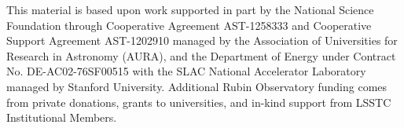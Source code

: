 \documentclass[twocolumn,longbib]{aastex7}
\begin{document}


\begin{acknowledgments}
This material is based upon work supported in part by the National Science Foundation through Cooperative Agreement AST-1258333 and Cooperative Support Agreement AST-1202910 managed by the Association of Universities for Research in Astronomy (AURA), and the Department of Energy under Contract No. DE-AC02-76SF00515 with the SLAC National Accelerator Laboratory managed by Stanford University.
Additional Rubin Observatory funding comes from private donations, grants to universities, and in-kind support from LSSTC Institutional Members.
\end{acknowledgments}




\end{document}
